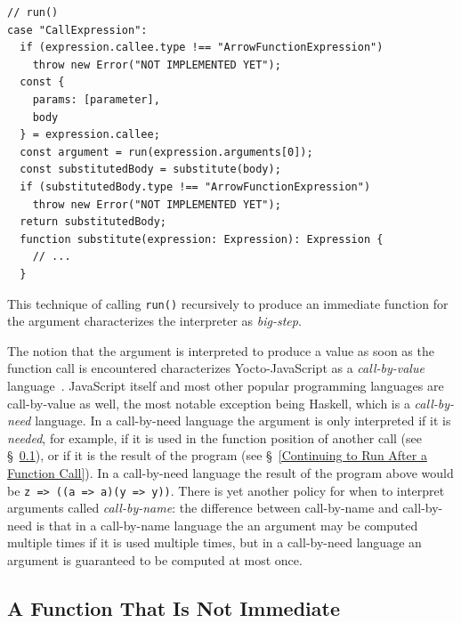 \documentclass[12pt, oneside]{book}
\begin{document}
\begin{verbatim}
// run()
case "CallExpression":
  if (expression.callee.type !== "ArrowFunctionExpression")
    throw new Error("NOT IMPLEMENTED YET");
  const {
    params: [parameter],
    body
  } = expression.callee;
  const argument = run(expression.arguments[0]);
  const substitutedBody = substitute(body);
  if (substitutedBody.type !== "ArrowFunctionExpression")
    throw new Error("NOT IMPLEMENTED YET");
  return substitutedBody;
  function substitute(expression: Expression): Expression {
    // ...
  }
\end{verbatim}

\begin{mdframed}[frametitle = {Technical Terms}]
This technique of calling \texttt{run()} recursively to produce an immediate function for the argument characterizes the interpreter as \emph{big-step}.
\end{mdframed}

\begin{mdframed}[frametitle = {Advanced}]
The notion that the argument is interpreted to produce a value as soon as the function call is encountered characterizes Yocto-JavaScript as a \emph{call-by-value} language~\cite{call-by-name-call-by-value-and-the-lambda-calculus}. JavaScript itself and most other popular programming languages are call-by-value as well, the most notable exception being Haskell, which is a \emph{call-by-need} language. In a call-by-need language the argument is only interpreted if it is \emph{needed}, for example, if it is used in the function position of another call (see §~\ref{A Function That Is Not Immediate}), or if it is the result of the program (see §~\ref{Continuing to Run After a Function Call}). In a call-by-need language the result of the program above would be \texttt{z => ((a => a)(y => y))}. There is yet another policy for when to interpret arguments called \emph{call-by-name}: the difference between call-by-name and call-by-need is that in a call-by-name language the an argument may be computed multiple times if it is used multiple times, but in a call-by-need language an argument is guaranteed to be computed at most once.
\end{mdframed}

\subsection{A Function That Is Not Immediate}
\label{A Function That Is Not Immediate}
\end{document}
